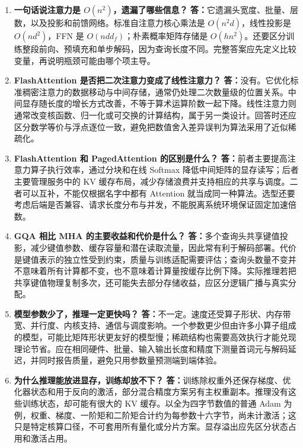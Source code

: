 \documentclass[UTF8,12pt,a4paper,fontset=fandol]{ctexart}
\begin{document}
\begin{enumerate}[resume*=trquestions]
\item \textbf{一句话说注意力是 $O(n^2)$，遗漏了哪些信息？}
\textbf{答：}它遗漏头宽度、批量、层数，以及投影和前馈网络。标准自注意力核心乘法是 $O(n^2d)$，线性投影是 $O(nd^2)$，FFN 是 $O(ndd_f)$；朴素概率矩阵存储是 $O(hn^2)$。还要区分训练整段前向、预填充和单步解码，因为查询长度不同。完整答案应先定义比较变量，再说明瓶颈可能由哪个项主导。

\item \textbf{FlashAttention 是否把二次注意力变成了线性注意力？}
\textbf{答：}没有。它优化标准稠密注意力的数据移动与中间存储，通常仍处理二次数量级的位置关系。中间显存随长度的增长方式改善，不等于算术运算阶数一起下降。线性注意力则通常改变核函数、归一化或可交换的计算结构，属于另一类设计。回答时还应区分数学等价与浮点逐位一致，避免把数值舍入差异误判为算法采用了近似稀疏化。

\item \textbf{FlashAttention 和 PagedAttention 的区别是什么？}
\textbf{答：}前者主要提高注意力算子执行效率，通过分块和在线 Softmax 降低中间矩阵的显存读写；后者主要管理服务中的 KV 缓存布局，减少存储浪费并支持相应的共享与调度。二者可以互补，不能仅根据名字中都有 Attention 就当成同一种算法。选型还要考虑后端是否兼容、请求长度分布与并发，不能脱离系统环境保证固定加速倍数。

\item \textbf{GQA 相比 MHA 的主要收益和代价是什么？}
\textbf{答：}多个查询头共享键值投影，减少键值参数、缓存容量和潜在读取流量，因此常有利于解码部署。代价是键值表示的独立性受到约束，质量与训练适配需要评估；查询头数量不变并不意味着所有计算都不变，也不意味着计算量按缓存比例下降。实际推理若把共享键值物理复制多次，还可能失去部分存储收益，应区分逻辑广播与真实分配。

\item \textbf{模型参数少了，推理一定更快吗？}
\textbf{答：}不一定。速度还受算子形状、内存带宽、并行度、内核支持、通信与调度影响。一个参数更少但由许多小算子组成的模型，可能比矩阵形状更友好的模型慢；稀疏结构也需要高效执行才能兑现理论节省。应在相同硬件、批量、输入输出长度和精度下测量首词元与解码延迟，并同时报告质量，避免只用参数量预测端到端体验。

\item \textbf{为什么推理能放进显存，训练却放不下？}
\textbf{答：}训练除权重外还保存梯度、优化器状态和用于反向的激活，部分混合精度方案另有主权重副本。推理没有这些训练状态，却可能有很大的 KV 缓存。以全为四字节数值的普通 Adam 为例，权重、梯度、一阶矩和二阶矩合计约为每参数十六字节，尚未计激活；这只是特定核算口径，不可套用所有量化或分片方案。显存溢出应先区分状态占用和激活占用。


\end{enumerate}
\end{document}
